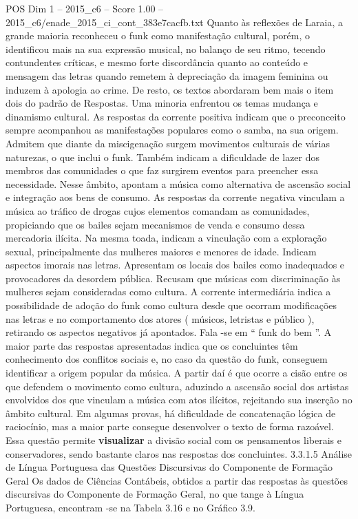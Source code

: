 \begin{textsample}{POS Dim 1 – 2015\_c6 – Score 1.00 – 2015\_c6/enade\_2015\_ci\_cont\_383e7cacfb.txt}
Quanto às reflexões de Laraia, a grande maioria reconheceu o funk como manifestação cultural, porém, o identificou mais na sua expressão musical, no balanço de seu ritmo, tecendo contundentes críticas, e mesmo forte discordância quanto ao conteúdo e mensagem das letras quando remetem à depreciação da imagem feminina ou induzem à apologia ao crime.
De resto, os textos abordaram bem mais o item dois do padrão de Respostas.
Uma minoria enfrentou os temas mudança e dinamismo cultural.
As respostas da corrente positiva indicam que o preconceito sempre acompanhou as manifestações populares como o samba, na sua origem.
Admitem que diante da miscigenação surgem movimentos culturais de várias naturezas, o que inclui o funk.
Também indicam a dificuldade de lazer dos membros das comunidades o que faz surgirem eventos para preencher essa necessidade.
Nesse âmbito, apontam a música como alternativa de ascensão social e integração aos bens de consumo.
As respostas da corrente negativa vinculam a música ao tráfico de drogas cujos elementos comandam as comunidades, propiciando que os bailes sejam mecanismos de venda e consumo dessa mercadoria ilícita.
Na mesma toada, indicam a vinculação com a exploração sexual, principalmente das mulheres maiores e menores de idade.
Indicam aspectos imorais nas letras.
Apresentam os locais dos bailes como inadequados e provocadores da desordem pública.
Recusam que músicas com discriminação às mulheres sejam consideradas como cultura.
A corrente intermediária indica a possibilidade de adoção do funk como cultura desde que ocorram modificações nas letras e no comportamento dos atores ( músicos, letristas e público ), retirando os aspectos negativos já apontados.
Fala -se em “ funk do bem ”.
A maior parte das respostas apresentadas indica que os concluintes têm conhecimento dos conflitos sociais e, no caso da questão do funk, conseguem identificar a origem popular da música.
A partir daí é que ocorre a cisão entre os que defendem o movimento como cultura, aduzindo a ascensão social dos artistas envolvidos dos que vinculam a música com atos ilícitos, rejeitando sua inserção no âmbito cultural.
Em algumas provas, há dificuldade de concatenação lógica de raciocínio, mas a maior parte consegue desenvolver o texto de forma razoável.
Essa questão permite \textbf{visualizar} a divisão social com os pensamentos liberais e conservadores, sendo bastante claros nas respostas dos concluintes. 3.3.1.5 Análise de Língua Portuguesa das Questões Discursivas do Componente de Formação Geral Os dados de Ciências Contábeis, obtidos a partir das respostas às questões discursivas do Componente de Formação Geral, no que tange à Língua Portuguesa, encontram -se na Tabela 3.16 e no Gráfico 3.9.

\end{textsample}
